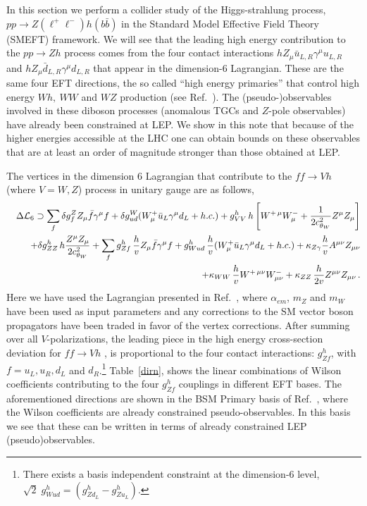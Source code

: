 In this section we perform a collider study of the Higgs-strahlung process, $pp \to Z(\ell^+ \ell^-)h(b\bar 
b)$ in the Standard Model Effective Field Theory (SMEFT) framework. We will see that the leading high energy contribution to the $pp \to Zh$ process comes from the four 
contact interactions  $hZ_\mu \bar{u}_{L,R} \gamma^\mu u_{L,R}$ and $hZ_\mu \bar{d}_{L,R} \gamma^\mu 
d_{L,R}$ that appear in the dimension-6 Lagrangian. These are the same four EFT directions, the so called ``high 
energy primaries'' that control  high energy $Wh,~WW$ and $WZ$ production (see Ref.~\cite{Franceschini:2017xkh}). The (pseudo-)observables involved in these diboson processes (anomalous TGCs and $Z$-pole observables)  have already been constrained at LEP.  We show in this note that    because of the higher  energies accessible at the LHC one can obtain bounds on these observables that are at least an order of magnitude stronger than those obtained at LEP.


The vertices in the dimension 6 Lagrangian that contribute 
to the $ff \to Vh$ (where $V=W,Z$) process in unitary gauge are as follows, 
\begin{eqnarray}
&&\Delta {\cal L}_6\supset \sum_f {\delta g^Z_{f}} Z_\mu \bar{f} \gamma^\mu f +\delta g^W_{ud} (W^+_\mu \bar{u}_L \gamma^\mu d_L+h.c.)
+ {g^h_{VV}}\,  h \left[W^{+\, \mu} W^-_\mu+\frac{1}{2c_{\theta_W}^2}Z^\mu Z_\mu\right]\nonumber \\
&&+  \delta g^h_{ZZ}\, h \frac{Z^\mu Z_\mu}{2c_{\theta_W}^2} + \sum_f g^h_{Zf}\,\frac{h}{v}Z_\mu \bar{f} \gamma^\mu f+g^h_{Wud}\,\frac{h}{v}(W^+_\mu \bar{u}_L \gamma^\mu d_L+h.c.)
+{\kappa_{Z \gamma }}\frac{h}{v} A^{\mu\nu} Z_{\mu\nu} \nonumber \\ 
&&+\kappa_{WW}\,\frac{h}{v}
 W^{+\, \mu\nu}W^-_{\mu\nu}
+\kappa_{ZZ}\,\frac{h}{2v} Z^{\mu\nu}Z_{\mu\nu}\,.
\label{lagr}
\end{eqnarray}
Here we have used the Lagrangian presented in Ref.~\cite{Gupta:2014rxa, Pomarol:2014dya}, where $\alpha_{em}$, $m_Z$ and $m_W$   have been used as input parameters and any corrections 
to the SM vector boson propagators  have 
been traded in favor of the vertex corrections. After summing over all $V$-polarizations, the leading 
piece in the high energy cross-section deviation for $ff \to Vh$ , is proportional to the four  contact interactions:  $g^h_{Zf}$, with $f=u_L, u_R,d_L$ and $d_R$.\footnote{There exists a basis independent constraint at the dimension-6 level, $\sqrt{2}\;g^h_{Wud}= (g^h_{Zd_L}-g^h_{Zu_L})$. } Table~\ref{dirn}, shows the linear combinations of Wilson coefficients contributing to the four 
$g^h_{Zf}$ couplings in different EFT bases.  The aforementioned directions are shown in the BSM Primary basis of Ref.~\cite{Gupta:2014rxa}, 
where the Wilson coefficients are already constrained pseudo-observables. In this basis we see that these can be written in terms of already constrained LEP (pseudo)observables. 

